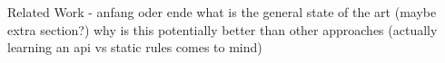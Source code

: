 
Related Work - anfang oder ende
	what is the general state of the art (maybe extra section?)
	why is this potentially better than other approaches (actually learning an api vs static rules comes to mind)
